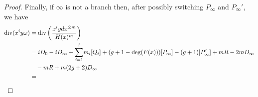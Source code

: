 \begin{proof}
    Finally, if $\infty$ is not a branch then, after possibly switching $P_\infty$ and $P_\infty'$, we have
        \begin{align*}
        \operatorname{div}(x^iy\omega) &  =  \operatorname{div} \left( \frac{x^i ydx^{\otimes m}}{H(x)^m} \right)\\ 
        & = iD_0 - iD_\infty + {\displaystyle \sum_{i=1}^l} m_i[Q_i] + (g+1-\deg(F(x)))[P_\infty] - (g+1)[P_\infty'] + mR - 2mD_\infty \\
        & \hspace{1em} - mR + m(2g+2)D_\infty \\
        & =  
        \end{align*}
    \end{proof}






















